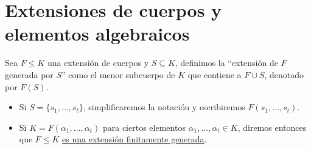 \section{Extensiones de cuerpos y elementos algebraicos}

\begin{definicion}
    Sea $F\leq K$ una extensión de cuerpos y $S\subseteq K$, definimos la ``extensión de $F$ generada por $S$'' como el menor subcuerpo de $K$ que contiene a $F\cup S$, denotado por $F(S)$.
    \begin{itemize}
        \item Si $S = \{s_1,\ldots,s_t\}$, simplificaremos la notación y escribiremos $F(s_1,\ldots,s_t)$.
        \item Si $K = F(\alpha_1, \ldots, \alpha_t)$ para ciertos elementos $\alpha_1, \ldots, \alpha_t\in K$, diremos entonces que $F\leq K$ \underline{es una extensión finitamente generada}.
    \end{itemize}
\end{definicion}

